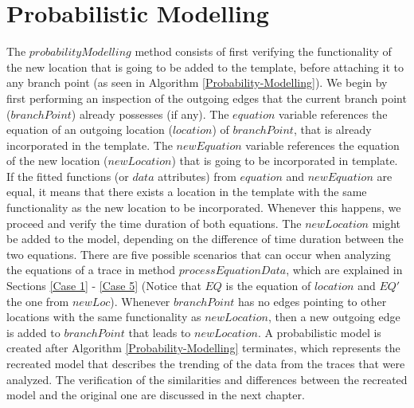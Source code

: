 

\section{Probabilistic Modelling}
The $probabilityModelling$ method consists of first verifying the functionality of the new location that is going to be added to the template, before attaching it to any branch point (as seen in Algorithm \ref{Probability-Modelling}). 
%
We begin by first performing an inspection of the outgoing edges that the current branch point ($branchPoint$) already possesses (if any). 
%
The $equation$ variable references the equation of an outgoing location ($location$) of $branchPoint$, that is already incorporated in the template.
%
The $newEquation$ variable references the equation of the new location ($newLocation$) that is going to be incorporated in template. 
%
If the fitted functions (or $data$ attributes) from $equation$ and $newEquation$ are equal, it means that there exists a location in the template with the same functionality as the new location to be incorporated. 
%
Whenever this happens, we proceed and verify the time duration of both equations.
%
The $newLocation$ might be added to the model, depending on the difference of time duration between the two equations. 
%
%
There are five possible scenarios that can occur when analyzing the equations of a trace in method $processEquationData$, which are explained in Sections \ref{Case 1} - \ref{Case 5} (Notice that $EQ$ is the equation of $location$ and $EQ'$ the one from $newLoc$). 
%
Whenever $branchPoint$ has no edges pointing to other locations with the same functionality as $newLocation$, then a new outgoing edge is added to $branchPoint$ that leads to $newLocation$. 
A probabilistic model is created after Algorithm \ref{Probability-Modelling} terminates, which represents the recreated model that describes the trending of the data from the traces that were analyzed. The verification of the similarities and differences between the recreated model and the original one are discussed in the next chapter. 
\\
\\

%
%


